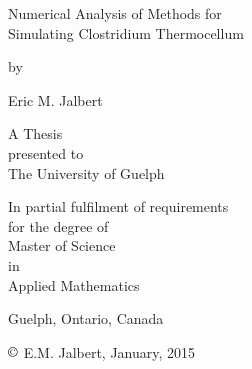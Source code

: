 \begin{titlepage}
  \begin{center}
    \vspace*{4cm}
    \LARGE{Numerical Analysis of Methods for \\Simulating Clostridium Thermocellum}
    \vspace*{0.5cm}
    
    \small{by}
    \vspace*{0.5cm}
    
    \large{Eric M. Jalbert}
    \vspace*{3.5cm}
    
    A Thesis\\presented to\\The University of Guelph
    \vspace*{1.5cm}
    
    In partial fulfilment of requirements\\for the degree of\\Master of Science\\in\\Applied Mathematics
    \vfill

    Guelph, Ontario, Canada
    
    $\copyright$ E.M. Jalbert, January, 2015
  \end{center}
\end{titlepage}





